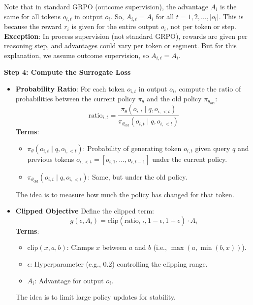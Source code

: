 \documentclass{article}
\begin{document}
\begin{itemize}
Note that in standard GRPO (outcome supervision), the advantage \( A_i \) is the same for all tokens \( o_{i,t} \) in output \( o_i \). So, \( A_{i,t} = A_i \) for all \( t = 1, 2, \dots, |o_i| \). This is because the reward \( r_i \) is given for the entire output \( o_i \), not per token or step.\\[1mm]
\textbf{Exception}: In process supervision (not standard GRPO), rewards are given per reasoning step, and advantages could vary per token or segment. But for this explanation, we assume outcome supervision, so \( A_{i,t} = A_i \).
\end{itemize}

\vspace{3mm}

\noindent\textbf{Step 4: Compute the Surrogate Loss} 
\begin{itemize}
    \item \textbf{Probability Ratio}: For each token \( o_{i,t} \) in output \( o_i \), compute the ratio of probabilities between the current policy \( \pi_\theta \) and the old policy \( \pi_{\theta_{\text{old}}} \):
\[
\text{ratio}_{i,t} = \frac{\pi_\theta(o_{i,t} \mid q, o_{i,<t})}{\pi_{\theta_{\text{old}}}(o_{i,t} \mid q, o_{i,<t})}
\]
\textbf{Terms}:
\begin{itemize}
    \item \( \pi_\theta(o_{i,t} \mid q, o_{i,<t}) \): Probability of generating token \( o_{i,t} \) given query \( q \) and previous tokens \( o_{i,<t} = [o_{i,1}, \dots, o_{i,t-1}] \) under the current policy.
    \item \( \pi_{\theta_{\text{old}}}(o_{i,t} \mid q, o_{i,<t}) \): Same, but under the old policy.
\end{itemize}
The idea is to measure how much the policy has changed for that token.
    \item \textbf{Clipped Objective} Define the clipped term:
\[
g(\epsilon, A_i) = \text{clip}(\text{ratio}_{i,t}, 1 - \epsilon, 1 + \epsilon) \cdot A_i
\]
\textbf{Terms}:
\begin{itemize}
    \item \( \text{clip}(x, a, b) \): Clamps \( x \) between \( a \) and \( b \) (i.e., \( \max(a, \min(b, x)) \)).
    \item \( \epsilon \): Hyperparameter (e.g., 0.2) controlling the clipping range.
    \item \( A_i \): Advantage for output \( o_i \).
\end{itemize}
The idea is to limit large policy updates for stability.

\end{itemize}
\end{document}
